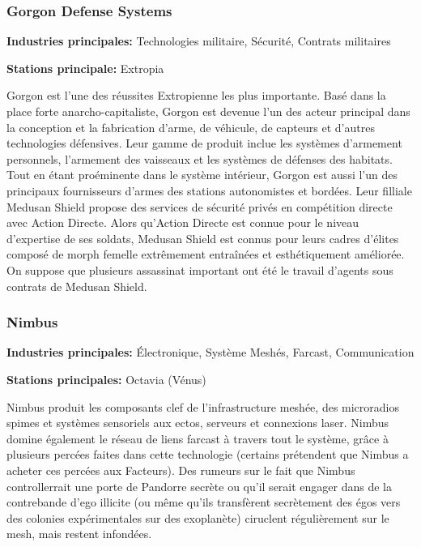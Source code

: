 \subsubsection{Gorgon Defense Systems} \label{sec:gorg-defense-syst} 

\textbf{Industries principales:} Technologies militaire, Sécurité, Contrats militaires 

\textbf{Stations principale:} Extropia 

Gorgon est l'une des réussites Extropienne les plus importante. Basé dans la place forte anarcho-capitaliste, Gorgon est devenue l'un des acteur principal dans la conception et la fabrication d'arme, de véhicule, de capteurs et d'autres technologies défensives. Leur gamme de produit inclue les systèmes d'armement personnels, l'armement des vaisseaux et les systèmes de défenses des habitats. Tout en étant proéminente dans le système intérieur, Gorgon est aussi l'un des principaux fournisseurs d'armes des stations autonomistes et bordées. Leur filliale Medusan Shield propose des services de sécurité privés en compétition directe avec Action Directe. Alors qu'Action Directe est connue pour le niveau d'expertise de ses soldats, Medusan Shield est connus pour leurs cadres d'élites composé de morph femelle extrêmement entraînées et esthétiquement améliorée. On suppose que plusieurs assassinat important ont été le travail d'agents sous contrats de Medusan Shield. 

\subsubsection{Nimbus} \label{sec:nimbus} 

\textbf{Industries principales:} Électronique, Système Meshés, Farcast, Communication 

\textbf{Stations principales:} Octavia (Vénus) 

Nimbus produit les composants clef de l'infrastructure meshée, des microradios spimes et systèmes sensoriels aux ectos, serveurs et connexions laser. Nimbus domine également le réseau de liens farcast à travers tout le système, grâce à plusieurs percées faites dans cette technologie (certains prétendent que Nimbus a acheter ces percées aux Facteurs). Des rumeurs sur le fait que Nimbus controllerrait une porte de Pandorre secrète ou qu'il serait engager dans de la contrebande d'ego illicite (ou même qu'ils transfèrent secrètement des égos vers des colonies expérimentales sur des exoplanète) ciruclent régulièrement sur le mesh, mais restent infondées. 

